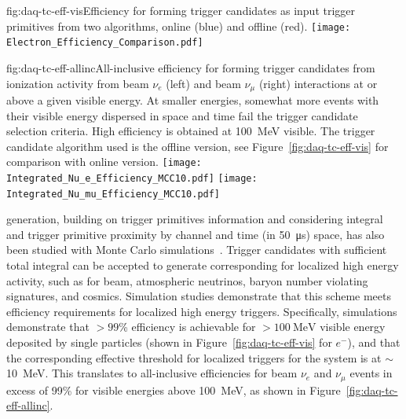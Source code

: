 \begin{dunefigure}{fig:daq-tc-eff-vis}{Efficiency for forming trigger candidates as input trigger primitives from two algorithms, online (blue) and offline (red).}
  \texttt{[image: Electron\_Efficiency\_Comparison.pdf]}
\end{dunefigure}

\begin{dunefigure}{fig:daq-tc-eff-allinc}{All-inclusive efficiency for
    forming trigger candidates from ionization activity from beam $\nu_e$
    (left) and beam $\nu_\mu$ (right) interactions at or above a given
    visible energy. 
    At smaller energies, somewhat more events with their visible energy
    dispersed in space and time fail the trigger candidate selection
    criteria. 
    High efficiency is obtained at \SI{100}{\MeV} visible. 
    The trigger candidate algorithm used is the offline version, see
    Figure~\ref{fig:daq-tc-eff-vis} for comparison with online version.}
 \texttt{[image: Integrated\_Nu\_e\_Efficiency\_MCC10.pdf]}%
 \texttt{[image: Integrated\_Nu\_mu\_Efficiency\_MCC10.pdf]}
\end{dunefigure}


 generation, building on trigger primitives information
and considering integral  and trigger primitive proximity by channel
and time (in \SI{50}{\micro\second}) space, has also been studied with Monte
Carlo simulations~\cite{bib:docdb11215}.
Trigger candidates with sufficient total integral   can be accepted to
generate corresponding  for localized high energy
activity, such as for beam, atmospheric neutrinos, baryon number
violating signatures, and cosmics.
Simulation studies demonstrate that this scheme meets efficiency
requirements for localized high energy triggers.
Specifically, simulations demonstrate that $>99$\% efficiency is
achievable for $>\SI{100}{\MeV}$ visible energy deposited by single particles
(shown in Figure~\ref{fig:daq-tc-eff-vis} for $e^-$), and that the
corresponding effective threshold for localized triggers for the system
is at $\sim$\SI{10}{\MeV}. This translates to all-inclusive efficiencies for
beam $\nu_e$ and $\nu_\mu$ events in excess of 99\% for visible energies
above \SI{100}{\MeV}, as shown in Figure~\ref{fig:daq-tc-eff-allinc}.


